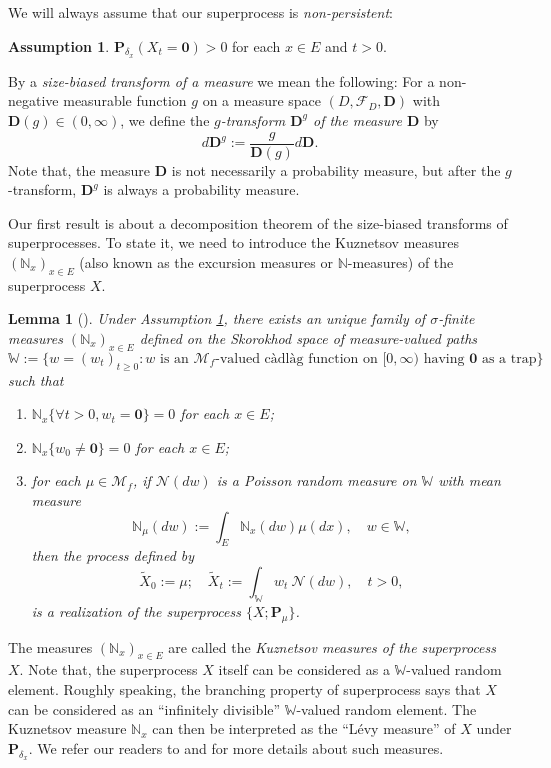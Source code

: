 \documentclass[UTF8]{pkuthss}
\theoremstyle{plain}
\newtheorem{lem}[thm]{Lemma}
\theoremstyle{definition}
\newtheorem{asp}{Assumption}[chapter]
\numberwithin{equation}{section}
\begin{document}
	We will always assume that our superprocess is \emph{non-persistent}:
\begin{asp}\label{asp:1}
	$\mathbf P_{\delta_x}(X_t = \mathbf 0) > 0$ for each $x \in E$ and $t>0$.
\end{asp}
	By a \emph{size-biased transform of a measure} we mean the following:
	For a non-negative measurable function $g$ on a measure space $(D,\mathscr F_D,\mathbf D)$ with $\mathbf D(g)\in (0,\infty)$, we define  the \emph{$g$-transform $\mathbf D^g$ of the measure $\mathbf D$} by
\[
	d\mathbf D^g
	:= \frac{g}{\mathbf D(g)} d\mathbf D.
\]
	Note that, the measure $\mathbf D$ is not necessarily a probability measure, but after the $g$-transform, $\mathbf D^g$ is always a probability measure.
	
	Our first result is about a decomposition theorem of the size-biased transforms of superprocesses.
	To state it, we need to introduce the Kuznetsov measures $(\mathbb N_x)_{x\in E}$ (also known as the excursion measures or $\mathbb N$-measures) of the superprocess $X$.
\begin{lem}[{\cite[Section 8.4 \& Theorem 8.24]{Li2011MeasureValued}}]
\label{lem: Kuznetsov measures}
	Under Assumption \ref{asp:1}, there exists an unique family of $\sigma$-finite measures $(\mathbb N_x)_{x\in E}$ defined on the Skorokhod space of measure-valued paths
\[
	\mathbb W :=\{ w= (w_t)_{t\geq 0}: w \text{ is an $\mathcal M_f$-valued c\`{a}dl\`{a}g function on $[0,\infty)$ having $\mathbf 0$ as a trap}\}
\]
	such that
\begin{enumerate}
\item
    $\mathbb N_x \{\forall t > 0, w_t=\mathbf 0\} =0$ for each $x\in E$;
\item
    $\mathbb N_x\{w_0 \neq \mathbf 0\} = 0$ for each $x\in E$;
\item
    for each $\mu \in \mathcal M_f$, if $\mathcal N(dw)$ is a Poisson random measure on $\mathbb W$ with mean measure
\[
  \mathbb N_\mu(dw):= \int_E \mathbb N_x(dw)\mu(dx), \quad w\in \mathbb W,
\]
  then the process defined by
\[
	\widetilde X_0 := \mu;
	\quad \widetilde X_t
	:=\int_{\mathbb W}w_t~\mathcal N(dw),
	\quad t>0,
\]
	is a realization of the superprocess $\{X; \mathbf P_{\mu}\}$.
\end{enumerate}
\end{lem}
The measures $(\mathbb N_x)_{x\in E}$ are called the \emph{Kuznetsov measures of the superprocess $X$}.
		Note that, the superprocess $X$ itself can be considered as a $\mathbb W$-valued random element.
    Roughly speaking, the branching property of superprocess  says that $X$ can be considered as an ``infinitely divisible'' $\mathbb W$-valued random element.
		The Kuznetsov measure $\mathbb N_x$ can then be interpreted as the ``L\'{e}vy measure'' of $X$ under $\mathbf P_{\delta_x}$.
	We refer our readers to \cite{DynkinKuznetsov2004Nmeasures} and \cite[Section 8.4]{Li2011MeasureValued} for more details about such measures.
\end{document}
